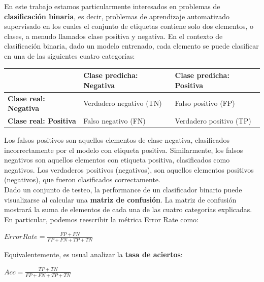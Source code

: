 En este trabajo estamos particularmente interesados en problemas de \textbf{clasificación binaria}, es decir, problemas de aprendizaje automatizado supervisado en los cuales el conjunto de etiquetas contiene solo dos elementos, o clases, a menudo llamados clase positiva y negativa. En el contexto de clasificación binaria, dado un modelo entrenado, cada elemento se puede clasificar en una de las siguientes cuatro categorías: \\

\begin{table}[h!]
\begin{tabular}{l|l|l|}
\cline{2-3}
                                                    & \textbf{Clase predicha: Negativa} & \textbf{Clase predicha: Positiva} \\ \hline
\multicolumn{1}{|l|}{\textbf{Clase real: Negativa}} & Verdadero negativo (TN)           & Falso positivo (FP)               \\ \hline
\multicolumn{1}{|l|}{\textbf{Clase real: Positiva}} & Falso negativo (FN)               & Verdadero positivo (TP)           \\ \hline
\end{tabular}
\end{table}

Los falsos positivos son aquellos elementos de clase negativa, clasificados incorrectamente por el modelo con etiqueta positiva. Similarmente, los falsos negativos son aquellos elementos con etiqueta positiva, clasificados como negativos. Los verdaderos positivos (negativos), son aquellos elementos positivos (negativos), que fueron clasificados correctamente. \\

Dado un conjunto de testeo, la performance de un clasificador binario puede visualizarse al calcular una \textbf{matriz de confusión}. La matriz de confusión mostrará la suma de elementos de cada una de las cuatro categorías explicadas. En particular, podemos reescribir la métrica Error Rate como: \\

\begin{center}
$ Error Rate = \frac{FP + FN}{FP + FN + TP + TN} $
\end{center}

Equivalentemente, es usual analizar la \textbf{tasa de aciertos}:

\begin{center}
$ Acc = \frac{TP + TN}{FP + FN + TP + TN} $
\end{center}

